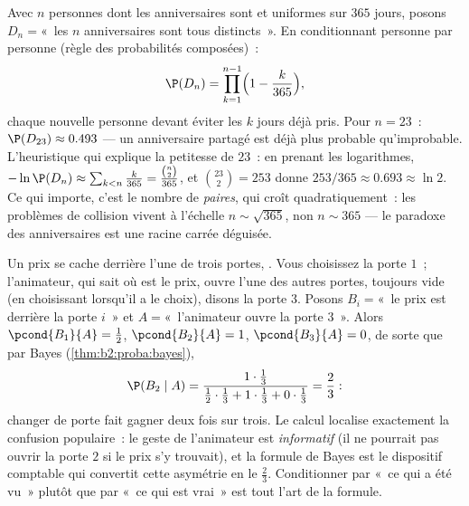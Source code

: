 \begin{example}\label{ex:b2:proba:birthday}
Avec $n$ personnes dont les anniversaires sont  et uniformes
sur $365$ jours, posons $D_n = {}$«~les $n$ anniversaires sont tous distincts~».
En conditionnant personne par personne (règle des probabilités composées)~:
\[
\P(D_n) = \prod_{k=1}^{n-1}\Bigl(1 - \frac{k}{365}\Bigr),
\]
chaque nouvelle personne devant éviter les $k$ jours déjà pris.
Pour $n = 23$~: $\P(D_{23}) \approx 0.493$ --- un
anniversaire partagé est déjà plus probable qu'improbable. L'heuristique qui
explique la petitesse de $23$~: en prenant les logarithmes, $-\ln
\P(D_n) \approx \sum_{k<n}\frac k{365} =
\frac{\binom n2}{365}$, et $\binom{23}2 = 253$ donne
$253/365 \approx 0.693 \approx \ln 2$. Ce qui importe, c'est le
nombre de \emph{paires}, qui croît quadratiquement~: les problèmes de
collision vivent à l'échelle $n \sim \sqrt{365}$, non $n \sim
365$ --- le paradoxe des anniversaires est une racine carrée déguisée.
\end{example}

\begin{example}\label{ex:b2:proba:montyhall}
Un prix se cache derrière l'une de trois portes, . Vous choisissez
la porte $1$~; l'animateur, qui sait où est le prix, ouvre l'une des
autres portes, toujours vide (en choisissant  lorsqu'il a le
choix), disons la porte $3$. Posons $B_i = {}$«~le prix est derrière la porte
$i$~» et $A = {}$«~l'animateur ouvre la porte $3$~». Alors
$\pcond{B_1}{A} = \frac12$, $\pcond{B_2}{A} = 1$,
$\pcond{B_3}{A} = 0$, de sorte que par Bayes
(\cref{thm:b2:proba:bayes}),
\[
\P(B_2 \mid A)
= \frac{1\cdot\frac13}
{\frac12\cdot\frac13 + 1\cdot\frac13 + 0\cdot\frac13}
= \frac23 :
\]
changer de porte fait gagner deux fois sur trois. Le calcul
localise exactement la confusion populaire~: le geste de l'animateur est
\emph{informatif} (il ne pourrait pas ouvrir la porte $2$ si le prix
s'y trouvait), et la formule de Bayes est le dispositif comptable
qui convertit cette asymétrie en le $\frac23$. Conditionner
par «~ce qui a été vu~» plutôt que par «~ce qui est vrai~» est tout
l'art de la formule.
\end{example}

